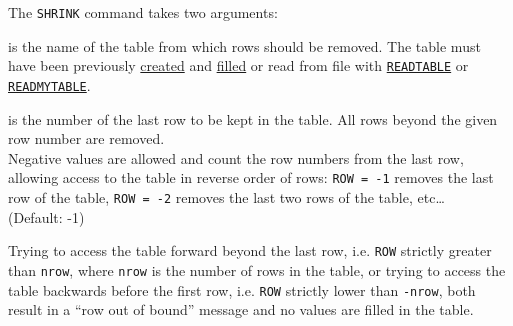 The {\tt SHRINK} command takes two arguments:
\begin{madlist}
	 is the name of the table from which rows should be removed. 
	The table must have been previously \hyperref[sec:create]{created} and 
	\hyperref[sec:fill]{filled} or read from file with \hyperref[sec:readtable]
	{\tt READTABLE} or \hyperref[sec:readmytable]{\tt READMYTABLE}.
	
	 is the number of the last row to be kept in the table. 
	All rows beyond the given row number are removed. \\
	Negative values are allowed and count the row numbers from
	the last row, allowing access to the table in reverse order of rows:
	\texttt{ROW~=~-1} removes the last row of the table,
	\texttt{ROW~=~-2} removes the last two rows of the table,
	etc\ldots  \\ 
	(Default: -1) 
\end{madlist}

Trying to access the table forward beyond the last row, i.e. \texttt{ROW}
strictly greater than {\tt nrow}, where {\tt nrow} is the number of
rows in the table, or trying to access the table backwards before the
first row, i.e. {\tt ROW} strictly lower than {\tt -nrow}, both
result in a ``row out of bound'' message and no values are filled in the
table. 





